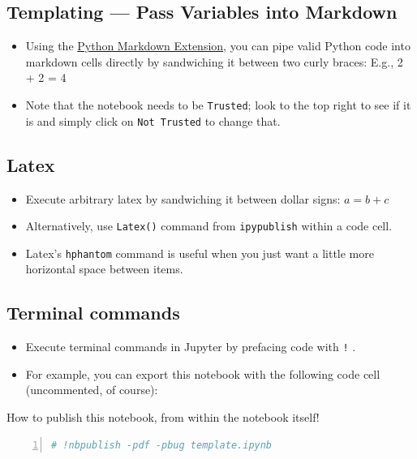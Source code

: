 \documentclass[10pt,parskip=half,
	toc=sectionentrywithdots,
	bibliography=totocnumbered,
	captions=tableheading,
    numbers=noendperiod,
    headings=standardclasses]{scrartcl}
\providecommand{\tightlist}{%
  \setlength{\itemsep}{0pt}\setlength{\parskip}{0pt}}
\begin{document}
\subsection{Templating --- Pass Variables into
Markdown}\label{templating-pass-variables-into-markdown}

\begin{itemize}
\tightlist
\item
  Using the
  \href{https://jupyter-contrib-nbextensions.readthedocs.io/en/latest/nbextensions/python-markdown/readme.html}{Python
  Markdown Extension}, you can pipe valid Python code into markdown
  cells directly by sandwiching it between two curly braces: E.g., 2 + 2
  = 4
\item
  Note that the notebook needs to be \texttt{Trusted}; look to the top
  right to see if it is and simply click on \texttt{Not\ Trusted} to
  change that.
\end{itemize}

\subsection{Latex}\label{latex}

\begin{itemize}
\tightlist
\item
  Execute arbitrary latex by sandwiching it between dollar signs:
  \(a = b+c\)
\item
  Alternatively, use \texttt{Latex()} command from \texttt{ipypublish}
  within a code cell.
\item
  Latex's \texttt{hphantom} command is useful when you just want a
  little more horizontal space between items.
\end{itemize}

\subsection{Terminal commands}\label{terminal-commands}

\begin{itemize}
\tightlist
\item
  Execute terminal commands in Jupyter by prefacing code with \texttt{!}
  .
\item
  For example, you can export this notebook with the following code cell
  (uncommented, of course):
\end{itemize}

\begin{codecell}[H]

    \caption{How to publish this notebook, from within the notebook itself!}\label{code:publish}\begin{lstlisting}[language=Python,numbers=left,xleftmargin=20pt,xrightmargin=5pt,belowskip=5pt,aboveskip=5pt]
# !nbpublish -pdf -pbug template.ipynb
\end{lstlisting}\end{codecell}
\end{document}
